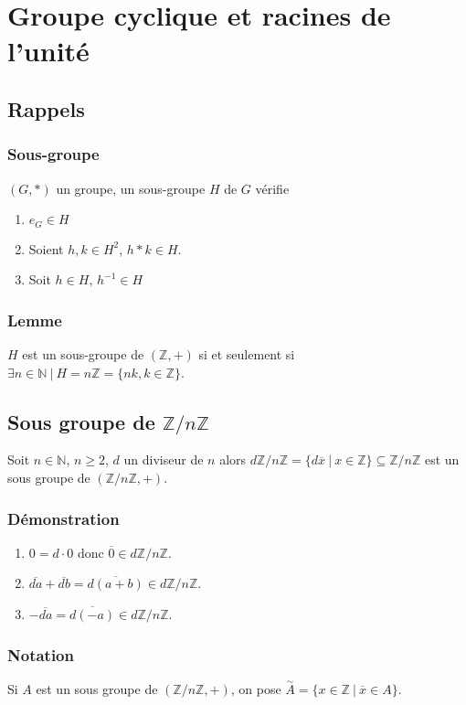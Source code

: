 \documentclass[a4paper,10pt]{book} %
\newcommand{\N}{\mathbb{N}}
\newcommand{\Z}{\mathbb{Z}}
\newcommand{\tq}{~|~}
\newcommand{\oversim}[1]{\overset{\sim}{#1}}
\begin{document}
\newpage

\section{Groupe cyclique et racines de l'unité}
\subsection{Rappels}
\subsubsection{Sous-groupe}
$(G,*)$ un groupe, un sous-groupe $H$ de $G$ vérifie
\begin{enumerate}
\item $e_G\in H$
\item Soient $h,k\in H^2$, $h*k\in H$.
\item Soit $h\in H$, $h^{-1}\in H$
\end{enumerate}

\subsubsection{Lemme}
$H$ est un sous-groupe de $(\Z ,+)$ si et seulement si $\exists n\in \N \tq H = n\Z =\{ nk,k\in \Z \}$.

\subsection{Sous groupe de $\Z/n\Z$}
Soit $n\in \N$, $n\geq 2$, $d$ un diviseur de $n$ alors $d\Z/n\Z=\{d\overline{x}\tq x\in \Z\}\subseteq \Z/n\Z$ est un sous groupe de $(\Z/n\Z,+)$.

\subsubsection{Démonstration}
\begin{enumerate}
\item $0=d\cdot 0$ donc $\overline{0}\in d\Z/n\Z$.
\item $\overline{da}+\overline{db}=\overline{d(a+b)} \in d\Z/n\Z$.
\item $-\overline{da}=\overline{d(-a)}\in d\Z/n\Z$.
\end{enumerate}

\subsubsection{Notation}
Si $A$ est un sous groupe de $(\Z/n\Z ,+)$, on pose $\oversim{A}=\{x\in\Z\tq \overline{x}\in A \}$.
\end{document}
